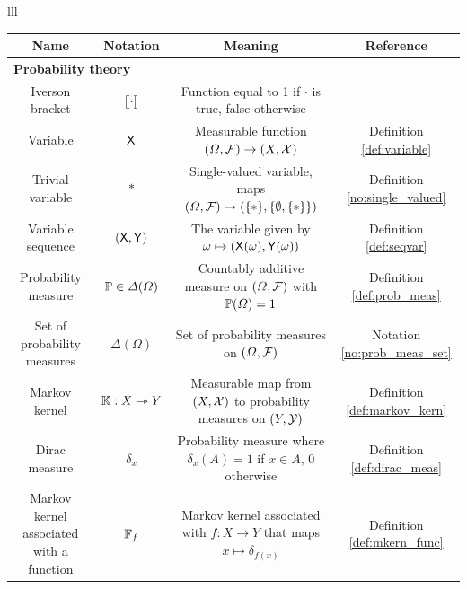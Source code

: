 


\begin{symbols}{lll} %

\begin{tabular}{ |c|c|c|c|} 
 \hline
 Name & Notation & Meaning & Reference \\
 \hline
 \multicolumn{4}{l}{\textbf{Probability theory}}\\
 \hline
 Iverson bracket & $\llbracket \cdot \rrbracket$ & Function equal to 1 if $\cdot$ is true, false otherwise & \\
 Variable & $\mathsf{X}$ & Measurable function $(\Omega,\mathcal{F})\to(X,\mathcal{X})$ & Definition \ref{def:variable} \\
 Trivial variable & $*$ & Single-valued variable, maps $(\Omega,\mathcal{F})\to (\{*\},\{\emptyset,\{*\}\})$ & Definition \ref{no:single_valued} \\
 Variable sequence & $(\mathsf{X},\mathsf{Y})$ & The variable given by $\omega\mapsto (\mathsf{X}(\omega),\mathsf{Y}(\omega))$ & Definition \ref{def:seqvar}\\
 Probability measure & $\mathbb{P}\in \Delta(\Omega)$ & Countably additive measure on $(\Omega,\mathcal{F})$ with $\mathbb{P}(\Omega)=1$ & Definition \ref{def:prob_meas}\\
 Set of probability measures & $\Delta(\Omega)$ & Set of probability measures on $(\Omega,\mathcal{F})$ & Notation \ref{no:prob_meas_set}\\
 Markov kernel & $\mathbb{K}:X\rightarrowtriangle Y$ & Measurable map from $(X,\mathcal{X})$ to probability measures on $(Y,\mathcal{Y})$ & Definition \ref{def:markov_kern}\\
 Dirac measure & $\delta_x$ & Probability measure where $\delta_x(A)=1$ if $x\in A$, $0$ otherwise & Definition \ref{def:dirac_meas}\\
 Markov kernel associated with a function & $\mathbb{F}_{f}$ & Markov kernel associated with $f:X\to Y$ that maps $x\mapsto \delta_{f(x)}$ & Definition \ref{def:mkern_func}\\

\end{tabular}
\end{symbols}
